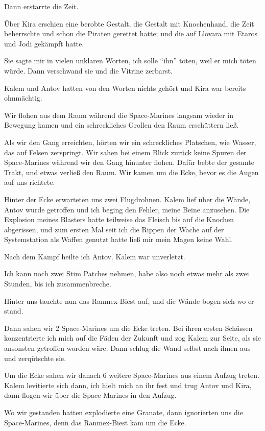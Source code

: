 \documentclass[11pt]{article}
\begin{document}
Dann erstarrte die Zeit.

Über Kira erschien eine berobte Gestalt, die Gestalt mit Knochenhand,
die Zeit beherrschte und schon die Piraten gerettet hatte; und die auf
Llovara mit Etaros und Jodi gekämpft hatte.

Sie sagte mir in vielen unklaren Worten, ich solle ``ihn'' töten, weil
er mich töten würde. Dann verschwand sie und die Vitrine zerbarst.

Kalem und Antov hatten von den Worten nichts gehört und Kira war bereits
ohnmächtig.

Wir flohen aus dem Raum während die Space-Marines langsam wieder in
Bewegung kamen und ein schreckliches Grollen den Raum erschüttern ließ.

Als wir den Gang erreichten, hörten wir ein schreckliches Platschen, wie
Wasser, das auf Felsen zerspringt. Wir sahen bei einem Blick zurück
keine Spuren der Space-Marines während wir den Gang hinunter flohen.
Dafür bebte der gesamte Trakt, und etwas verließ den Raum. Wir kamen um
die Ecke, bevor es die Augen auf uns richtete.

Hinter der Ecke erwarteten uns zwei Flugdrohnen. Kalem lief über die
Wände, Antov wurde getroffen und ich beging den Fehler, meine Beine
anzusehen. Die Explosion meines Blasters hatte teilweise das Fleisch bis
auf die Knochen abgerissen, und zum ersten Mal seit ich die Rippen der
Wache auf der Systemstation als Waffen genutzt hatte ließ mir mein Magen
keine Wahl.

Nach dem Kampf heilte ich Antov. Kalem war unverletzt.

Ich kann noch zwei Stim Patches nehmen, habe also noch etwas mehr als
zwei Stunden, bis ich zusammenbreche.

Hinter uns tauchte nun das Ranmex-Biest auf, und die Wände bogen sich wo
er stand.

Dann sahen wir 2 Space-Marines um die Ecke treten. Bei ihren ersten
Schüssen konzentrierte ich mich auf die Fäden der Zukunft und zog Kalem
zur Seite, als sie ansonsten getroffen worden wäre. Dann schlug die Wand
selbst nach ihnen aus und zerqütschte sie.

Um die Ecke sahen wir danach 6 weitere Space-Marines aus einem Aufzug
treten.\\ Kalem levitierte sich dann, ich hielt mich an ihr fest und
trug Antov und Kira, dann flogen wir über die Space-Marines in den
Aufzug.

Wo wir gestanden hatten explodierte eine Granate, dann ignorierten uns
die Space-Marines, denn das Ranmex-Biest kam um die Ecke.
\end{document}
